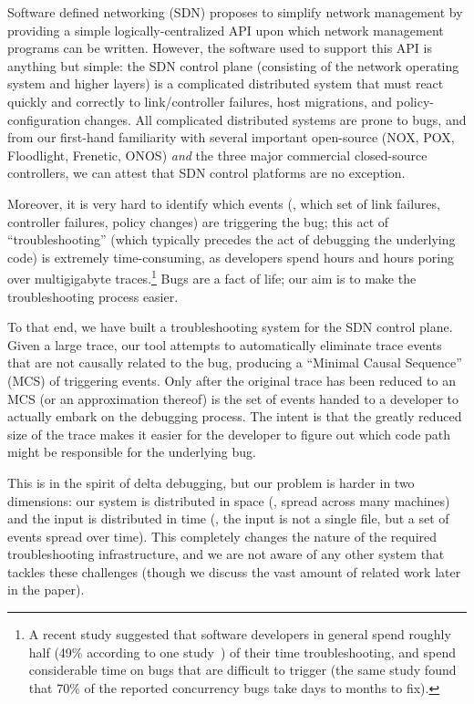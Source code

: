 Software defined networking (SDN) proposes to simplify network management by providing a simple logically-centralized API upon which network management programs can be written.  However, the software used to support this API is anything but simple: the SDN control plane (consisting of the network operating system and higher layers) is a complicated distributed system that must react quickly and correctly to link/controller failures, host migrations, and policy-configuration changes.
All complicated distributed systems are prone to bugs, and from our first-hand familiarity with several important open-source (NOX, POX, Floodlight, Frenetic, ONOS) \emph{and} the three major commercial closed-source controllers, we can attest that SDN control platforms are no exception. 

Moreover, it is very hard to identify which events (\ie, which set of link failures, controller failures, policy changes) are triggering the bug; this act of ``troubleshooting'' (which typically precedes the act of debugging the underlying code) is extremely time-consuming, as developers spend hours and hours poring over multigigabyte traces.\footnote{A recent study suggested that software developers in general spend roughly half (49\% according to one
study~\cite{msoft_concurrency}) of their time troubleshooting, and spend considerable time on bugs that are difficult to trigger (the same study found that 70\% of the reported concurrency bugs take days to months to fix).} Bugs are a fact of life; our aim is to make the troubleshooting process easier.

To that end, we have built a troubleshooting system for the SDN control plane. Given a large trace, our tool attempts to automatically eliminate trace events that are not causally related to the bug, producing a ``Minimal Causal Sequence'' (MCS) of triggering events. Only after the original trace has been reduced to an MCS (or an approximation thereof) is the set of events handed to a developer to actually embark on the debugging process. The intent is that the greatly reduced size of the trace makes it easier for the developer to figure out which code path might be responsible for the underlying bug.

This is in the spirit of delta debugging, but our problem is harder in two dimensions: our system is distributed in space (\ie, spread across many machines) and the input is distributed in time (\ie, the input is not a single file, but a set of events spread over time). This completely changes the nature of the required troubleshooting infrastructure, and we are not aware of any other system that tackles these challenges (though we discuss the vast amount of related work later in the paper).

